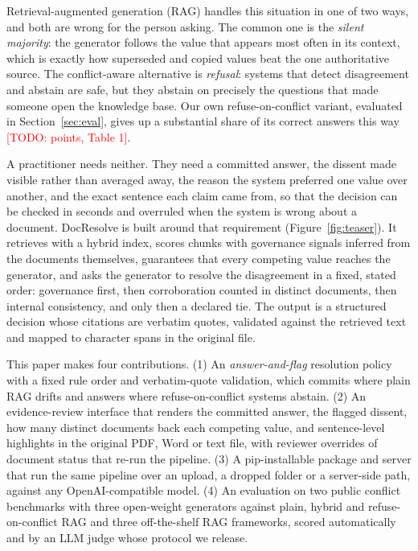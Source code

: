 \documentclass[11pt]{article}
\newcommand{\sysname}{DocResolve}   %
\newcommand{\todo}[1]{\textcolor{red}{[TODO: #1]}}
\begin{document}
Retrieval-augmented generation (RAG) handles this situation in one of two
ways, and both are wrong for the person asking. The common one is the
\emph{silent majority}: the generator follows the value that appears most
often in its context, which is exactly how superseded and copied values
beat the one authoritative source. The conflict-aware alternative is
\emph{refusal}: systems that detect disagreement and abstain are safe, but
they abstain on precisely the questions that made someone open the
knowledge base. Our own refuse-on-conflict variant, evaluated in
Section~\ref{sec:eval}, gives up a substantial share of its correct answers
this way \todo{points, Table 1}.

A practitioner needs neither. They need a committed answer, the dissent
made visible rather than averaged away, the reason the system preferred one
value over another, and the exact sentence each claim came from, so that
the decision can be checked in seconds and overruled when the system is
wrong about a document. \sysname{} is built around that requirement
(Figure~\ref{fig:teaser}). It retrieves with a hybrid index, scores chunks
with governance signals inferred from the documents themselves, guarantees
that every competing value reaches the generator, and asks the generator
to resolve the disagreement in a fixed, stated order: governance first,
then corroboration counted in distinct documents, then internal
consistency, and only then a declared tie. The output is a structured
decision whose citations are verbatim quotes, validated against the
retrieved text and mapped to character spans in the original file.

This paper makes four contributions.
(1) An \emph{answer-and-flag} resolution policy with a fixed rule order and
verbatim-quote validation, which commits where plain RAG drifts and answers
where refuse-on-conflict systems abstain.
(2) An evidence-review interface that renders the committed answer, the
flagged dissent, how many distinct documents back each competing value,
and sentence-level highlights in the original PDF, Word or text file, with
reviewer overrides of document status that re-run the pipeline.
(3) A pip-installable package and server that run the same pipeline over an
upload, a dropped folder or a server-side path, against any
OpenAI-compatible model.
(4) An evaluation on two public conflict benchmarks with three open-weight
generators against plain, hybrid and refuse-on-conflict RAG and three
off-the-shelf RAG frameworks, scored automatically and by an LLM judge
whose protocol we release.
\end{document}
